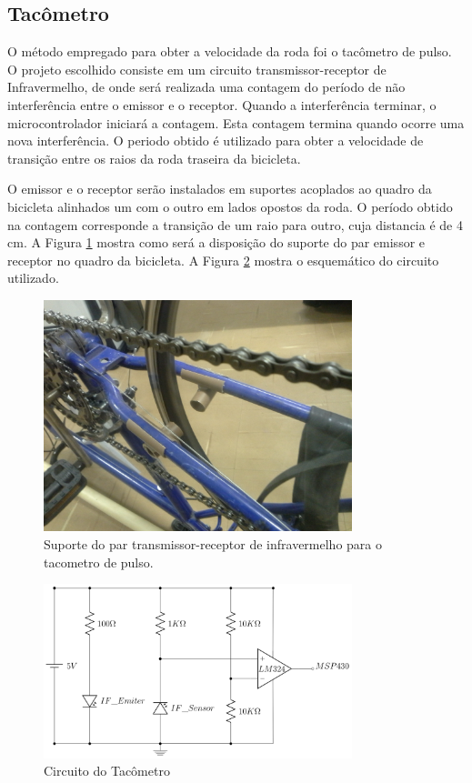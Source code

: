 \subsection{Tacômetro} %
\label{sub:tac_metro}

O método empregado para obter a velocidade da roda foi o tacômetro de pulso. O projeto escolhido consiste em um circuito transmissor-receptor de Infravermelho, de onde será realizada uma contagem do período de não interferência entre o emissor e o receptor. Quando a interferência terminar, o microcontrolador iniciará a contagem. Esta contagem termina quando ocorre uma nova interferência. O periodo obtido é utilizado para obter a velocidade de transição entre os raios da roda traseira da bicicleta.

O emissor e o receptor serão instalados em suportes acoplados ao quadro da bicicleta alinhados um com o outro em lados opostos da roda. O período obtido na contagem corresponde a transição de um raio para outro, cuja distancia é de 4 cm. A Figura \ref{fig:sens_tac} mostra como será a disposição do suporte do par emissor e receptor no quadro da bicicleta. A Figura \ref{fig:figuras_tacometro} mostra o esquemático do circuito utilizado.

\begin{figure}[h]
  \centering
  \includegraphics[width=0.8\textwidth]
      {figuras/sup_tac.jpg}
  \caption{Suporte do par transmissor-receptor de infravermelho para o tacometro de pulso.}
  \label{fig:sens_tac}
\end{figure}

\begin{figure}[h]
  \centering
	\includegraphics[width=0.8\textwidth]{figuras/tacometro}
  \caption{Circuito do Tacômetro}
  \label{fig:figuras_tacometro}
\end{figure}

